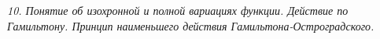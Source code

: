\emph{10. Понятие об изохронной и полной вариациях функции. Действие по
Гамильтону. Принцип наименьшего действия Гамильтона-Остроградского.}

\newpage
